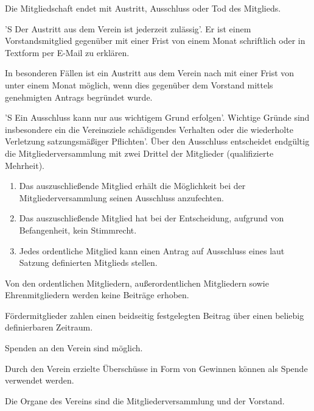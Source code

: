 \documentclass[%
    parskip=half,
]{scrartcl}
\begin{document}
\begin{contract}

Die Mitgliedschaft endet mit Austritt, Ausschluss oder Tod des Mitglieds.

'S Der Austritt aus dem Verein ist jederzeit zulässig'.
Er ist einem Vorstandsmitglied gegenüber mit einer Frist von einem Monat schriftlich oder in Textform per E-Mail zu erklären.\label{p:austritt}

In besonderen Fällen ist ein Austritt aus dem Verein nach  mit einer Frist von unter einem Monat möglich, wenn dies gegenüber dem Vorstand mittels genehmigten Antrags begründet wurde.

'S Ein Ausschluss kann nur aus wichtigem Grund erfolgen'.
Wichtige Gründe sind insbesondere ein die Vereinsziele schädigendes Verhalten oder die wiederholte Verletzung satzungsmäßiger Pflichten'.
Über den Ausschluss entscheidet endgültig die Mitgliederversammlung mit zwei Drittel der Mitglieder (qualifizierte Mehrheit).

\begin{enumerate}[\qquad a)]
    \item Das auszuschließende Mitglied erhält die Möglichkeit bei der Mitgliederversammlung seinen Ausschluss anzufechten.
    \item Das auszuschließende Mitglied hat bei der Entscheidung, aufgrund von Befangenheit, kein Stimmrecht.
    \item Jedes ordentliche Mitglied kann einen Antrag auf Ausschluss eines laut Satzung definierten Mitglieds stellen.
\end{enumerate}


Von den ordentlichen Mitgliedern, außerordentlichen Mitgliedern sowie Ehrenmitgliedern werden keine Beiträge erhoben.

Fördermitglieder zahlen einen beidseitig festgelegten Beitrag über einen beliebig definierbaren Zeitraum.


Spenden an den Verein sind möglich.

Durch den Verein erzielte Überschüsse in Form von Gewinnen können als Spende verwendet werden.


Die Organe des Vereins sind die Mitgliederversammlung und der Vorstand.



\end{contract}
\end{document}
